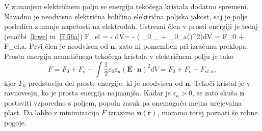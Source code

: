V zunanjem električnem polju se energija tekočega kristala dodatno spremeni. 
Navadno je neodvisna električna količina električna poljska jakost, saj je polje posledica
zunanje napetosti na elektrodah. Ustrezni člen v prosti energiji je tedaj 
(enačbi~\ref{lcwe} in~\ref{7.56a})
\beq
F_{el} = -\int {} \cdot{} dV= - \int
\left( \varepsilon_0 \varepsilon_\bot {}\cdot{} + 
\varepsilon_{0}\varepsilon_{a}(\cdot{})^{2}\right)dV = F_0 + F_{el,a}.
\eeq
Prvi člen je neodvisen od $\mathbf{n}$, zato ni pomemben pri izračunu
preklopa. Prosta energija
nematičnega tekočega kristala v električnem polju je tako 
\begin{equation}
F=F_{0}+F_{e}-\int \frac{1}{2}\varepsilon_{0}\varepsilon_{a}
(\mathbf{E}\cdot \mathbf{n})^{2}dV = F_0 + F_e + F_{el,a},
\label{7.72}
\end{equation}
 kjer $F_{0}$ predstavlja del proste energije, ki je neodvisen od $\mathbf{n}$.
Tekoči kristal je v ravnovesju, ko je prosta energija najmanjša. Kadar je
$\epsilon_{a}>0$, se zato skuša $\mathbf{n}$ postaviti vzporedno s
poljem, popoln zasuk pa onemogoča mejna urejevalna plast. 
Da lahko z minimizacijo $F$ izrazimo $\mathbf{n}(\mathbf{r})$, moramo
torej poznati še robne pogoje.

